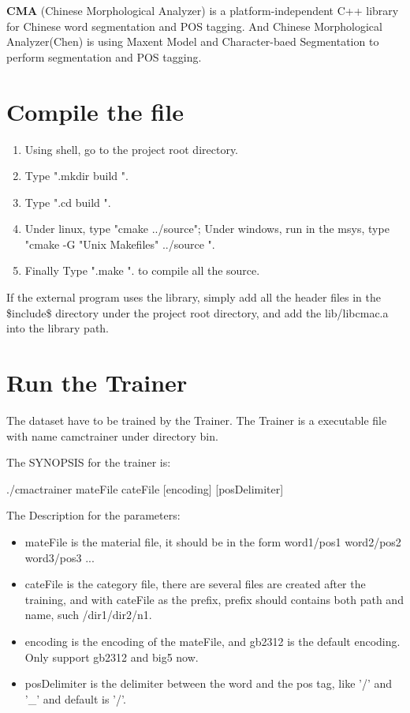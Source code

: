 {\bf CMA} (Chinese Morphological Analyzer) is a platform-independent C++ library for Chinese word segmentation and POS tagging. And Chinese Morphological Analyzer(Chen) is using Maxent Model and Character-baed Segmentation to perform segmentation and POS tagging.\section{Compile the file}\label{index_compilefile}
\begin{enumerate}
\item Using shell, go to the project root directory. \item Type ".mkdir build ". \item Type ".cd build ". \item Under linux, type "cmake ../source"; Under windows, run in the msys, type "cmake -G "Unix Makefiles" ../source ". \item Finally Type ".make ". to compile all the source. \end{enumerate}


If the external program uses the library, simply add all the header files in the \$include\$ directory under the project root directory, and add the lib/libcmac.a into the library path.\section{Run the Trainer}\label{index_runtrainer}
The dataset have to be trained by the Trainer. The Trainer is a executable file with name camctrainer under directory bin.

The SYNOPSIS for the trainer is: \par
 ./cmactrainer mateFile cateFile [encoding] [posDelimiter] \par


\par
The Description for the parameters: \begin{itemize}
\item mateFile is the material file, it should be in the form word1/pos1 word2/pos2 word3/pos3 ... \item cateFile is the category file, there are several files are created after the training, and with cateFile as the prefix, prefix should contains both path and name, such /dir1/dir2/n1. \item encoding is the encoding of the mateFile, and gb2312 is the default encoding. Only support gb2312 and big5 now. \item posDelimiter is the delimiter between the word and the pos tag, like '/' and '\_\-' and default is '/'. \end{itemize}


